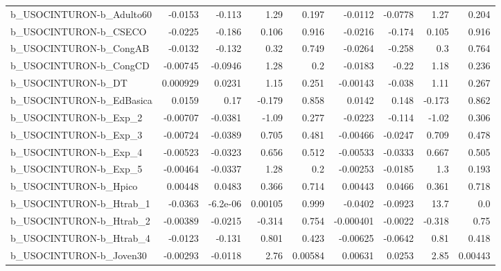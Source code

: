 \begin{tabular}{lrrrrrrrr}
b\_USOCINTURON-b\_Adulto60   &     -0.0153 &       -0.113 &     1.29 &    0.197 &    -0.0112 &     -0.0778 &         1.27 &         0.204 \\
b\_USOCINTURON-b\_CSECO      &     -0.0225 &       -0.186 &    0.106 &    0.916 &    -0.0216 &      -0.174 &        0.105 &         0.916 \\
b\_USOCINTURON-b\_CongAB     &     -0.0132 &       -0.132 &     0.32 &    0.749 &    -0.0264 &      -0.258 &          0.3 &         0.764 \\
b\_USOCINTURON-b\_CongCD     &    -0.00745 &      -0.0946 &     1.28 &      0.2 &    -0.0183 &       -0.22 &         1.18 &         0.236 \\
b\_USOCINTURON-b\_DT         &    0.000929 &       0.0231 &     1.15 &    0.251 &   -0.00143 &      -0.038 &         1.11 &         0.267 \\
b\_USOCINTURON-b\_EdBasica   &      0.0159 &         0.17 &   -0.179 &    0.858 &     0.0142 &       0.148 &       -0.173 &         0.862 \\
b\_USOCINTURON-b\_Exp\_2      &    -0.00707 &      -0.0381 &    -1.09 &    0.277 &    -0.0223 &      -0.114 &        -1.02 &         0.306 \\
b\_USOCINTURON-b\_Exp\_3      &    -0.00724 &      -0.0389 &    0.705 &    0.481 &   -0.00466 &     -0.0247 &        0.709 &         0.478 \\
b\_USOCINTURON-b\_Exp\_4      &    -0.00523 &      -0.0323 &    0.656 &    0.512 &   -0.00533 &     -0.0333 &        0.667 &         0.505 \\
b\_USOCINTURON-b\_Exp\_5      &    -0.00464 &      -0.0337 &     1.28 &      0.2 &   -0.00253 &     -0.0185 &          1.3 &         0.193 \\
b\_USOCINTURON-b\_Hpico      &     0.00448 &       0.0483 &    0.366 &    0.714 &    0.00443 &      0.0466 &        0.361 &         0.718 \\
b\_USOCINTURON-b\_Htrab\_1    &     -0.0363 &     -6.2e-06 &  0.00105 &    0.999 &    -0.0402 &     -0.0923 &         13.7 &           0.0 \\
b\_USOCINTURON-b\_Htrab\_2    &    -0.00389 &      -0.0215 &   -0.314 &    0.754 &  -0.000401 &     -0.0022 &       -0.318 &          0.75 \\
b\_USOCINTURON-b\_Htrab\_4    &     -0.0123 &       -0.131 &    0.801 &    0.423 &   -0.00625 &     -0.0642 &         0.81 &         0.418 \\
b\_USOCINTURON-b\_Joven30    &    -0.00293 &      -0.0118 &     2.76 &  0.00584 &    0.00631 &      0.0253 &         2.85 &       0.00443 \\

\end{tabular}
